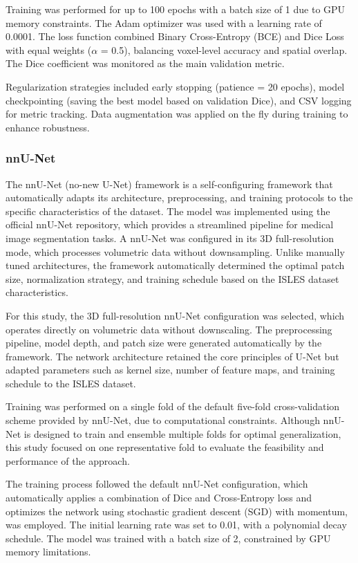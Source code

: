 \documentclass[12pt]{article}
\begin{document}
Training was performed for up to 100 epochs with a batch size of 1 due to GPU memory constraints. The Adam optimizer was used with a learning rate of 0.0001. The loss function combined Binary Cross-Entropy (BCE) and Dice Loss with equal weights ($\alpha$ = 0.5), balancing voxel-level accuracy and spatial overlap. The Dice coefficient was monitored as the main validation metric.

Regularization strategies included early stopping (patience = 20 epochs), model checkpointing (saving the best model based on validation Dice), and CSV logging for metric tracking. Data augmentation was applied on the fly during training to enhance robustness.

\subsubsection{nnU-Net} \label{subsec:nnu-net}

The nnU-Net \cite{Isensee2021} (no-new U-Net) framework is a self-configuring framework that automatically adapts its architecture, preprocessing, and training protocols to the specific characteristics of the dataset. The model was implemented using the official nnU-Net repository, which provides a streamlined pipeline for medical image segmentation tasks. A nnU-Net   was configured in its 3D full-resolution mode, which processes volumetric data without downsampling. Unlike manually tuned architectures, the framework automatically determined the optimal patch size, normalization strategy, and training schedule based on the ISLES dataset characteristics.  

For this study, the 3D full-resolution nnU-Net configuration was selected, which operates directly on volumetric data without downscaling. The preprocessing pipeline, model depth, and patch size were generated automatically by the framework. The network architecture retained the core principles of U-Net but adapted parameters such as kernel size, number of feature maps, and training schedule to the ISLES dataset.

Training was performed on a single fold of the default five-fold cross-validation scheme provided by nnU-Net, due to computational constraints. Although nnU-Net is designed to train and ensemble multiple folds for optimal generalization, this study focused on one representative fold to evaluate the feasibility and performance of the approach.

The training process followed the default nnU-Net configuration, which automatically applies a combination of Dice and Cross-Entropy loss and optimizes the network using stochastic gradient descent (SGD) with momentum, was employed. The initial learning rate was set to 0.01, with a polynomial decay schedule. The model was trained with a batch size of 2, constrained by GPU memory limitations.
\end{document}
